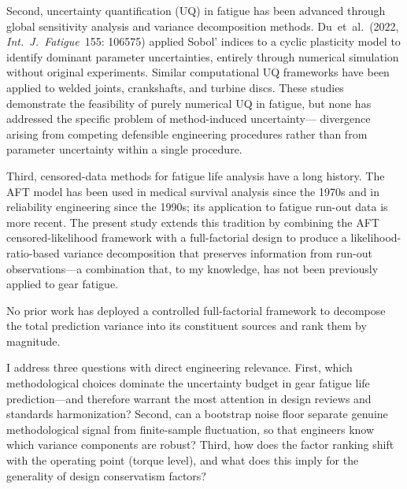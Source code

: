 \documentclass[12pt,a4paper]{article}
\begin{document}
Second, uncertainty quantification (UQ) in fatigue has been advanced
through global sensitivity analysis and variance decomposition methods.
Du~et~al.~(2022, \emph{Int.~J.~Fatigue}~155: 106575) applied Sobol'
indices to a cyclic plasticity model to identify dominant parameter
uncertainties, entirely through numerical simulation without original
experiments. Similar computational UQ frameworks have been applied to
welded joints, crankshafts, and turbine discs. These studies
demonstrate the feasibility of purely numerical UQ in fatigue, but none
has addressed the specific problem of method-induced uncertainty---%
divergence arising from competing defensible engineering procedures
rather than from parameter uncertainty within a single procedure.

Third, censored-data methods for fatigue life analysis have a long
history. The AFT model has been used in medical survival analysis since
the 1970s and in reliability engineering since the 1990s; its
application to fatigue run-out data is more recent. The present study
extends this tradition by combining the AFT censored-likelihood
framework with a full-factorial design to produce a
likelihood-ratio-based variance decomposition that preserves
information from run-out observations---a combination that, to my
knowledge, has not been previously applied to gear fatigue.

No prior work has deployed a controlled full-factorial framework to
decompose
the total prediction variance into its constituent sources and rank
them by magnitude.

I address three questions with direct engineering relevance. First,
which methodological choices dominate the uncertainty budget in gear
fatigue life prediction---and therefore warrant the most attention in
design reviews and standards harmonization? Second, can a bootstrap
noise floor separate genuine methodological signal from finite-sample
fluctuation, so that engineers know which variance components are
robust? Third, how does the factor ranking shift with the operating
point (torque level), and what does this imply for the generality of
design conservatism factors?
\end{document}
